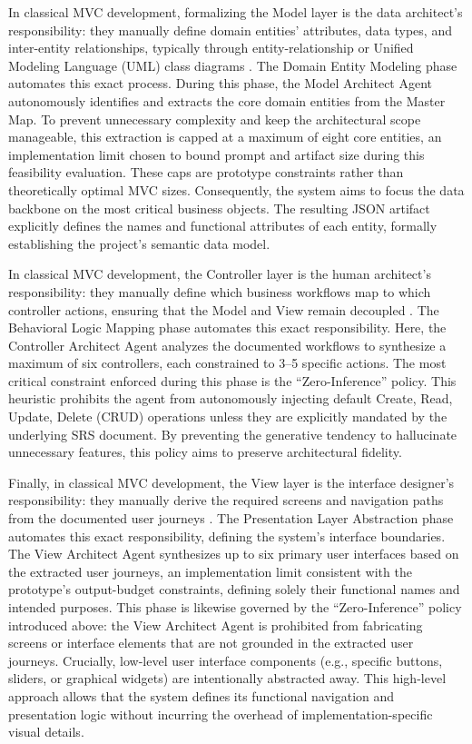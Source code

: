 In classical MVC development, formalizing the Model layer is the data architect's responsibility: they manually define domain entities' attributes, data types, and inter-entity relationships, typically through entity-relationship or Unified Modeling Language (UML) class diagrams \citep{Gamma1994}. The Domain Entity Modeling phase automates this exact process. During this phase, the Model Architect Agent autonomously identifies and extracts the core domain entities from the Master Map. To prevent unnecessary complexity and keep the architectural scope manageable, this extraction is capped at a maximum of eight core entities, an implementation limit chosen to bound prompt and artifact size during this feasibility evaluation. These caps are prototype constraints rather than theoretically optimal MVC sizes. Consequently, the system aims to focus the data backbone on the most critical business objects. The resulting JSON artifact explicitly defines the names and functional attributes of each entity, formally establishing the project's semantic data model.

In classical MVC development, the Controller layer is the human architect's responsibility: they manually define which business workflows map to which controller actions, ensuring that the Model and View remain decoupled \citep{Gamma1994}. The Behavioral Logic Mapping phase automates this exact responsibility. Here, the Controller Architect Agent analyzes the documented workflows to synthesize a maximum of six controllers, each constrained to 3–5 specific actions. The most critical constraint enforced during this phase is the ``Zero-Inference'' policy. This heuristic prohibits the agent from autonomously injecting default Create, Read, Update, Delete (CRUD) operations unless they are explicitly mandated by the underlying SRS document. By preventing the generative tendency to hallucinate unnecessary features, this policy aims to preserve architectural fidelity.

Finally, in classical MVC development, the View layer is the interface designer's responsibility: they manually derive the required screens and navigation paths from the documented user journeys \citep{Gamma1994}. The Presentation Layer Abstraction phase automates this exact responsibility, defining the system's interface boundaries. The View Architect Agent synthesizes up to six primary user interfaces based on the extracted user journeys, an implementation limit consistent with the prototype's output-budget constraints, defining solely their functional names and intended purposes. This phase is likewise governed by the ``Zero-Inference'' policy introduced above: the View Architect Agent is prohibited from fabricating screens or interface elements that are not grounded in the extracted user journeys. Crucially, low-level user interface components (e.g., specific buttons, sliders, or graphical widgets) are intentionally abstracted away. This high-level approach allows that the system defines its functional navigation and presentation logic without incurring the overhead of implementation-specific visual details.

